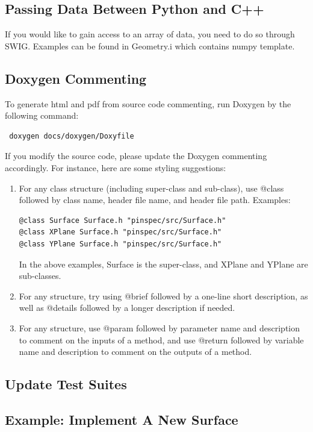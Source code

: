 \documentclass[titlepage]{article}
\begin{document}
\subsection{Passing Data Between Python and C++} \label{data}
If you would like to gain access to an array of data, you need to do so through SWIG. Examples can be found in Geometry.i which contains numpy template. 


\subsection{Doxygen Commenting} \label{doxygen}
To generate html and pdf from source code commenting, run Doxygen by the following command:
\begin{verbatim}
 doxygen docs/doxygen/Doxyfile
\end{verbatim}

If you modify the source code, please update the Doxygen commenting accordingly. For instance, here are some styling suggestions:
\begin{enumerate}
\item For any class structure (including super-class and sub-class), use @class followed by class name, header file name, and header file path. Examples:
\begin{verbatim}
@class Surface Surface.h "pinspec/src/Surface.h"
@class XPlane Surface.h "pinspec/src/Surface.h"
@class YPlane Surface.h "pinspec/src/Surface.h"
\end{verbatim}
In the above examples, Surface is the super-class, and XPlane and YPlane are sub-classes. 

\item For any structure, try using @brief followed by a one-line short description, as well as @details followed by a longer description if needed. 

\item For any structure, use @param followed by parameter name and description to comment on the inputs of a method, and use @return followed by variable name and description to comment on the outputs of a method. 
\end{enumerate}


\clearpage
\subsection{Update Test Suites}

\clearpage
\subsection{Example: Implement A New Surface}
\end{document}
